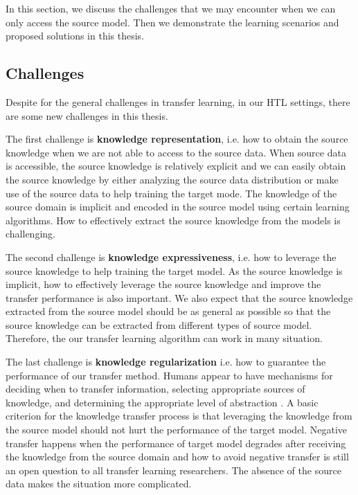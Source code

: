 In this section, we discuss the challenges that we may encounter when we can only access the source model. Then we demonstrate the learning scenarios and proposed solutions in this thesis.

\subsection{Challenges}
Despite for the general challenges in transfer learning, in our HTL settings, there are some new challenges in this thesis.

The first challenge is \textbf{knowledge representation}, i.e. how to obtain the source knowledge when we are not able to access to the source data. When source data is accessible, the source knowledge is relatively explicit and we can easily obtain the source knowledge by either analyzing the source data distribution or make use of the source data to help training the target mode. The knowledge of the source domain is implicit and encoded in the source model using certain learning algorithms. How to effectively extract the source knowledge from the models is challenging.

The second challenge is \textbf{knowledge expressiveness}, i.e. how to leverage the source knowledge to help training the target model. As the source knowledge is implicit, how to effectively leverage the source knowledge and improve the transfer performance is also important. We also expect that the source knowledge extracted from the source model should be as general as possible so that the source knowledge can be extracted from different types of source model. Therefore, the our transfer learning algorithm can work in many situation. 

The last challenge is \textbf{knowledge regularization} i.e. how to guarantee the performance of our transfer method. 
Humans appear to have mechanisms for deciding when to transfer information, selecting appropriate sources of knowledge, and determining the appropriate level of abstraction \cite{torrey2009transfer}. 
A basic criterion for the knowledge transfer process is that leveraging the knowledge from the source model should not hurt the performance of the target model. Negative transfer \cite{pan2010survey} happens when the performance of target model degrades after receiving the knowledge from the source domain and how to avoid negative transfer is still an open question to all transfer learning researchers. The absence of the source data makes the situation more complicated.

